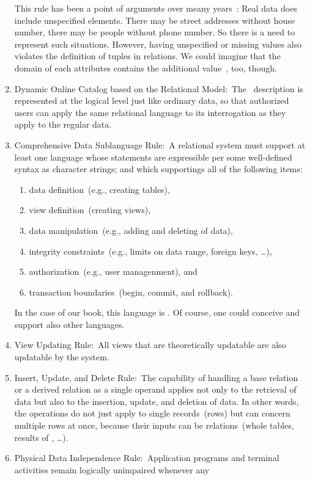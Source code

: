 \begin{enumerate}
This rule has been a point of arguments over meany years~\cite{C20245YOQ}:
Real data does include unspecified elements.
There may be street addresses without house number, there may be people without phone number.
So there is a need to represent such situations.
However, having unspecified or missing values also violates the definition of tuples in relations.
We could imagine that the domain of each attributes contains the additional value~, too, though.%
%
\item Dynamic Online Catalog based on the Relational Model:~The \db\ description is represented at the logical level just like ordinary data, so that authorized users can apply the same relational language to its interrogation as they apply to the regular data.%
%
\item Comprehensive Data Sublanguage Rule:~A relational system must support at least one language whose statements are expressible per some well-defined syntax as character strings; and which supportings all of the following items:%
\begin{enumerate}%
\item data definition~(e.g., creating tables),%
\item view definition~(creating views),%
\item data manipulation~(e.g., adding and deleting of data),%
\item integrity constraints~(e.g., limits on data range, foreign keys, \dots),%
\item authorization~(e.g., user managenment), and%
\item transaction boundaries~(begin, commit, and rollback).%
\end{enumerate}
In the case of our book, this language is \sql.
Of course, one could conceive and support also other languages.%
%
\item View Updating Rule:~All views that are theoretically updatable are also updatable by the system.%
%
\item Insert, Update, and Delete Rule:~The capability of handling a base relation or a derived relation as a single operand applies not only to the retrieval of data but also to the insertion, update, and deletion of data.
In other words, the operations do not just apply to single records~(rows) but can concern multiple rows at once, because their inputs can be relations~(whole tables, results of , \dots).%
%
\item Physical Data Independence Rule:~Application programs and terminal activities remain logically unimpaired whenever any

\end{enumerate}
